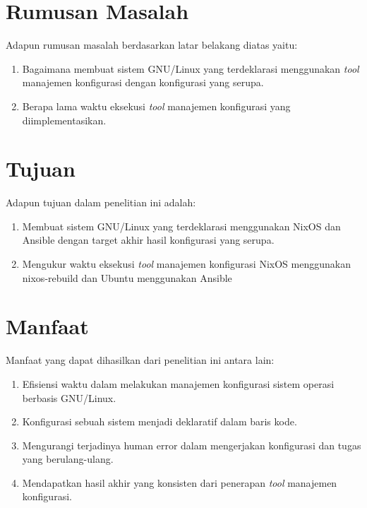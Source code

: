 \documentclass[10pt,twoside]{report}
\begin{document}
\vspace{3mm}
\section{Rumusan Masalah}

\begin{adjustwidth}{0.70cm}{}
	Adapun rumusan masalah berdasarkan latar belakang diatas yaitu:
	\begin{enumerate}[leftmargin=0.45cm, nolistsep]
		\item Bagaimana membuat sistem GNU/Linux yang terdeklarasi menggunakan \textit{tool}
		      manajemen konfigurasi dengan konfigurasi yang serupa.
		\item Berapa lama waktu eksekusi \textit{tool} manajemen konfigurasi yang diimplementasikan.
	\end{enumerate}
\end{adjustwidth}
\section{Tujuan}

\begin{adjustwidth}{0.70cm}{}
	Adapun tujuan dalam penelitian ini adalah:
	\begin{enumerate}[leftmargin=0.45cm, nolistsep]
		\item Membuat sistem GNU/Linux yang terdeklarasi menggunakan NixOS dan
		      Ansible dengan target akhir hasil konfigurasi yang serupa.
		\item Mengukur waktu eksekusi \textit{tool} manajemen konfigurasi NixOS menggunakan nixos-rebuild
		      dan Ubuntu menggunakan Ansible
	\end{enumerate}
\end{adjustwidth}
\vspace{3mm}
\section{Manfaat}

\begin{adjustwidth}{0.70cm}{}
	Manfaat yang dapat dihasilkan dari penelitian ini antara lain:
	\begin{enumerate}[leftmargin=0.45cm, nolistsep]
		\item Efisiensi waktu dalam melakukan manajemen konfigurasi sistem operasi berbasis GNU/Linux.
		\item Konfigurasi sebuah sistem menjadi deklaratif dalam baris kode.
		\item Mengurangi terjadinya human error dalam mengerjakan konfigurasi dan tugas yang berulang-ulang.
		\item Mendapatkan hasil akhir yang konsisten dari penerapan \textit{tool} manajemen konfigurasi.
	\end{enumerate}
\end{adjustwidth}
\vspace{3mm}
\end{document}
